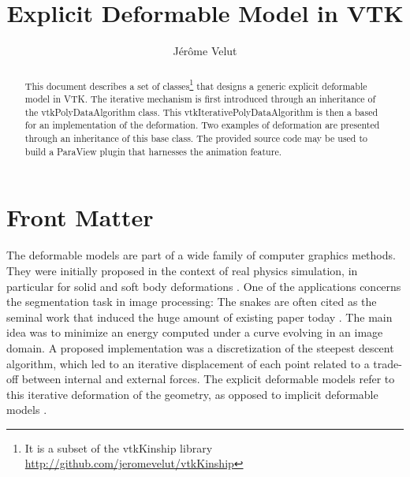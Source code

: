 \documentclass{InsightArticle}
\title{Explicit Deformable Model in VTK}
\author{J\'er\^ome Velut}
\newcommand{\IJhandlerIDnumber}{3251}
\begin{document}
%
% 
\IJhandlefooter{\IJhandlerIDnumber}


\ifpdf
\else
\fi


\maketitle


\ifhtml
\chapter*{Front Matter\label{front}}
\fi


\begin{abstract}
\noindent
This document describes a set of classes\footnote{It is a subset of the
vtkKinship library \url{http://github.com/jeromevelut/vtkKinship}} that 
designs a generic explicit deformable model in VTK. The iterative mechanism
is first introduced through an inheritance of the vtkPolyDataAlgorithm class. 
This vtkIterativePolyDataAlgorithm is then a based for an implementation of the
deformation. Two examples of deformation are presented through an inheritance of
this base class. The provided source code may be used to build a ParaView plugin
that harnesses the animation feature.
\end{abstract}

\IJhandlenote{\IJhandlerIDnumber}

\tableofcontents

The deformable models are part of a wide family of computer graphics methods.
They were initially proposed in the context of real physics simulation, 
in particular for solid and soft body deformations \cite{TER87,TER88.3}. One of the
applications concerns the segmentation task in image processing:
The snakes \cite{KAS87} are often cited as the seminal work that induced the
huge amount of existing paper today \cite{MON01}. The main idea was to minimize
an energy computed under a curve evolving in an image domain. A proposed 
implementation was a discretization of the steepest descent algorithm, which
led to an iterative displacement of each point related to a trade-off between
internal and external forces. The explicit deformable models refer to this 
iterative deformation of the geometry, as opposed to implicit deformable
models \cite{}.
\end{document}
